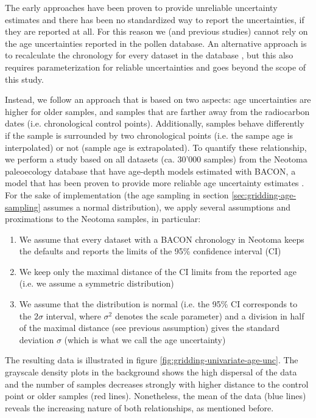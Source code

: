 \begin{refsection}
The early approaches have been proven to provide unreliable uncertainty estimates \citep{TelfordHeegaardBirks2004} and there has been no standardized way to report the uncertainties, if they are reported at all. For this reason we (and previous studies) cannot rely on the age uncertainties reported in the pollen database. An alternative approach is to recalculate the chronology for every dataset in the database \citep[see][for instance]{Goring2019}, but this also requires parameterization for reliable uncertainties and goes beyond the scope of this study.

Instead, we follow an approach that is based on two aspects: age uncertainties are higher for older samples, and samples that are farther away from the radiocarbon dates (i.e. chronological control points). Additionally, samples behave differently if the sample is surrounded by two chronological points (i.e. the sampe age is interpolated) or not (sample age is extrapolated). To quantify these relationship, we perform a study based on all datasets (ca. 30'000 samples) from the Neotoma paleoecology database \citep{WilliamsGrimmBloisEtAl2018} that have age-depth models estimated with BACON, a model that has been proven to provide more reliable age uncertainty estimates \citep{TrachselTelford2016}. For the sake of implementation (the age sampling in section \ref{sec:gridding-age-sampling} assumes a normal distribution), we apply several assumptions and proximations to the Neotoma samples, in particular:
%
\begin{enumerate}
	\item We assume that every dataset with a BACON chronology in Neotoma keeps the defaults and reports the limits of the 95\% confidence interval (CI)
	\item We keep only the maximal distance of the CI limits from the reported age (i.e. we assume a symmetric distribution)
	\item We assume that the distribution is normal (i.e. the 95\% CI corresponds to the $2\sigma$ interval, where $\sigma^2$ denotes the scale parameter) and a division in half of the maximal distance (see previous assumption) gives the standard deviation $\sigma$ (which is what we call the age uncertainty)
\end{enumerate}
%
The resulting data is illustrated in figure \ref{fig:gridding-univariate-age-unc}. The grayscale density plots in the background shows the high dispersal of the data and the number of samples decreases strongly with higher distance to the control point or older samples (red lines). Nonetheless, the mean of the data (blue lines) reveals the increasing nature of both relationships, as mentioned before.


\end{refsection}
